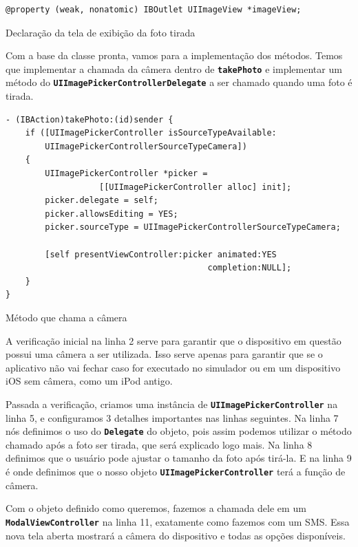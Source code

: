 \documentclass[a4paper,12pt,brazil,oneside]{book}
\begin{document}
\begin{listing}[H]
\begin{verbatim}
@property (weak, nonatomic) IBOutlet UIImageView *imageView;
\end{verbatim}
\caption{Declaração da tela de exibição da foto tirada}
\end{listing}


Com a base da classe pronta, vamos para a implementação dos métodos. Temos que implementar a chamada da câmera dentro de \texttt{\textbf{takePhoto}} e implementar um método do \texttt{\textbf{UIImagePickerControllerDelegate}} a ser chamado quando uma foto é tirada.

\begin{listing}[H]
\begin{verbatim}
- (IBAction)takePhoto:(id)sender {
    if ([UIImagePickerController isSourceTypeAvailable:
        UIImagePickerControllerSourceTypeCamera])
    {
        UIImagePickerController *picker =
                   [[UIImagePickerController alloc] init];
        picker.delegate = self;
        picker.allowsEditing = YES;
        picker.sourceType = UIImagePickerControllerSourceTypeCamera;
        
        [self presentViewController:picker animated:YES
                                         completion:NULL];
    }
}
\end{verbatim}
\caption{Método que chama a câmera}
\end{listing}


A verificação inicial na linha 2 serve para garantir que o dispositivo em questão possui uma câmera a ser utilizada. Isso serve apenas para garantir que se o aplicativo não vai fechar caso for executado no simulador ou em um dispositivo iOS sem câmera, como um iPod antigo.

Passada a verificação, criamos uma instância de \texttt{\textbf{UIImagePickerController}} na linha 5, e configuramos 3 detalhes importantes nas linhas seguintes. Na linha 7 nós definimos o uso do \texttt{\textbf{Delegate}} do objeto, pois assim podemos utilizar o método chamado após a foto ser tirada, que será explicado logo mais. Na linha 8 definimos que o usuário pode ajustar o tamanho da foto após tirá-la. E na linha 9 é onde definimos que o nosso objeto \texttt{\textbf{UIImagePickerController}} terá a função de câmera.

Com o objeto definido como queremos, fazemos a chamada dele em um\\ \texttt{\textbf{ModalViewController}} na linha 11, exatamente como fazemos com um SMS. Essa nova tela aberta mostrará a câmera do dispositivo e todas as opções disponíveis.
\end{document}
